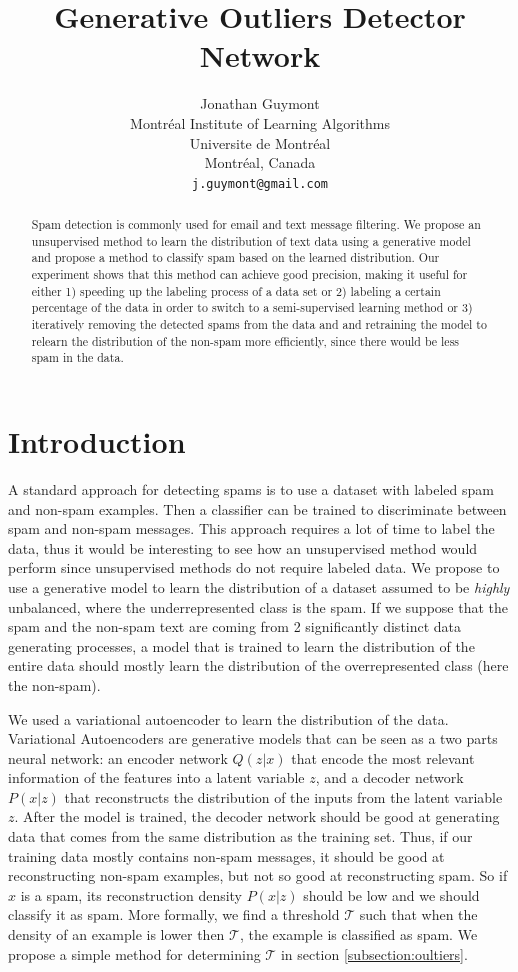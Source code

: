 \documentclass[10pt]{article}
\title{Generative Outliers Detector Network}
\author{
  Jonathan Guymont \\
  Montréal Institute of Learning Algorithms\\
  Universite de Montréal\\
  Montréal, Canada\\
  \texttt{j.guymont@gmail.com}\\
}
\begin{document}
\maketitle

\begin{abstract}
	Spam detection is commonly used for email and text message filtering. We propose an unsupervised method to learn the distribution of text data using a generative model and propose a method to classify spam based on the learned distribution. Our experiment shows that this method can achieve good precision, making it useful for either 1) speeding up the labeling process of a data set or 2) labeling a certain percentage of the data in order to switch to a semi-supervised learning method or 3) iteratively removing the detected spams from the data and and retraining the model to relearn the distribution of the non-spam more efficiently, since there would be less spam in the data.
\end{abstract}


\section{Introduction}
\label{sec:intro}
A standard approach for detecting spams is to use a dataset with labeled spam and non-spam examples. Then a classifier can be trained to discriminate between spam and non-spam messages. This approach requires a lot of time to label the data, thus it would be interesting to see how an unsupervised method would perform since unsupervised methods do not require labeled data. We propose to use a generative model to learn the distribution of a dataset assumed to be \emph{highly} unbalanced, where the underrepresented class is the spam. If we suppose that the spam and the non-spam text are coming from 2 significantly distinct data generating processes, a model that is trained to learn the distribution of the entire data should mostly learn the distribution of the overrepresented class (here the non-spam).

We used a variational autoencoder \cite{kingma2013auto} to learn the distribution of the data. Variational Autoencoders are generative models that can be seen as a two parts neural network: an encoder network $Q(z|x)$ that encode the most relevant information of the features into a latent variable $z$, and a decoder network $P(x|z)$ that reconstructs the distribution of the inputs from the latent variable $z$. After the model is trained, the decoder network should be good at generating data that comes from the same distribution as the training set. Thus, if our training data mostly contains non-spam messages, it should be good at reconstructing non-spam examples, but not so good at reconstructing spam. So if $x$ is a spam, its reconstruction density $P(x|z)$ should be low and we should classify it as spam. More formally, we find a threshold $\mathcal{T}$ such that when the density of an example is lower then $\mathcal{T}$, the example is classified as spam. We propose a simple method for determining $\mathcal{T}$ in section \ref{subsection:oultiers}.
\end{document}
